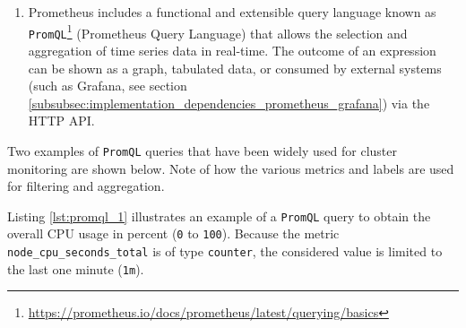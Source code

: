 \begin{enumerate}
\begin{enumerate}
\begin{enumerate}
          \item \texttt{Summary}
            \newline
            Similar to \texttt{Histogram} type, it also calculates configurable
            quantiles over a time window\footnote{\url{https://prometheus.io/docs/concepts/metric_types/\#summary}}.
        \end{enumerate}

      \item \texttt{Labels}
        \newline
        Labels allow Prometheus' dimensional data model: each given combination
        of labels for the same metric name identifies a unique dimensional
        instantiation of that metric. These dimensions can be used to filter and
        aggregate data by the \texttt{PromQL} query language.
        \newline
        For example, \lstinline[language=prometheus, alsoletter={_},
        morekeywords={node_cpu_seconds_total}, morekeywords={[2]{cpu, mode}}]|node_cpu_seconds_total{cpu="0",mode="idle"}|,
        determines the number of seconds spent in idle mode by CPU core 0.
    \end{enumerate}

  \item Prometheus includes a functional and extensible query language known as \texttt{PromQL}\footnote{\url{https://prometheus.io/docs/prometheus/latest/querying/basics}}
    (Prometheus Query Language) that allows the selection and aggregation of
    time series data in real-time. The outcome of an expression can be shown as a
    graph, tabulated data, or consumed by external systems (such as Grafana, see
    section \ref{subsubsec:implementation_dependencies_prometheus_grafana}) via
    the HTTP API\cite{prometheus_promql}.
\end{enumerate}

Two examples of \texttt{PromQL} queries that have been widely used for cluster
monitoring are shown below. Note of how the various metrics and labels are used for
filtering and aggregation.

Listing \ref{lst:promql_1} illustrates an example of a \texttt{PromQL} query to
obtain the overall CPU usage in percent (\texttt{0} to \texttt{100}). Because the
metric \lstinline[language=prometheus, alsoletter={_}, morekeywords={node_cpu_seconds_total}]{node_cpu_seconds_total}
is of type \texttt{counter}, the considered value is limited to the last one minute
(\texttt{1m}).

